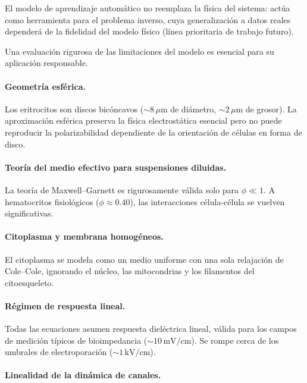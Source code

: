 \documentclass[12pt]{article}
\begin{document}
El modelo de aprendizaje autom\'atico no reemplaza la
f\'isica del sistema: act\'ua como herramienta para el
problema inverso, cuya generalizaci\'on a datos reales
depender\'a de la fidelidad del modelo f\'isico
(l\'inea prioritaria de trabajo futuro).



Una evaluaci\'on rigurosa de las limitaciones del modelo es esencial para su aplicaci\'on
responsable.
\paragraph{Geometr\'ia esf\'erica.}

Los eritrocitos son discos bic\'oncavos ($\sim 8\,\mu$m de di\'ametro, $\sim 2\,\mu$m de
grosor). La aproximaci\'on esf\'erica preserva la f\'isica electrost\'atica esencial pero no puede
reproducir la polarizabilidad dependiente de la orientaci\'on de c\'elulas en forma de disco.

\paragraph{Teor\'ia del medio efectivo para suspensiones diluidas.}

La teor\'ia de Maxwell--Garnett es rigurosamente v\'alida solo para $\phi \ll 1$. A hematocritos
fisiol\'ogicos ($\phi \approx 0.40$), las interacciones c\'elula-c\'elula se vuelven significativas.

\paragraph{Citoplasma y membrana homog\'eneos.}

El citoplasma se modela como un medio uniforme con una sola relajaci\'on de Cole--Cole,
ignorando el n\'ucleo, las mitocondrias y los filamentos del citoesqueleto.

\paragraph{R\'egimen de respuesta lineal.}

Todas las ecuaciones asumen respuesta diel\'ectrica lineal, v\'alida para los campos de medici\'on
t\'ipicos de bioimpedancia ($\sim 10\,\text{mV/cm}$). Se rompe cerca de los umbrales de
electroporaci\'on ($\sim 1\,\text{kV/cm}$).

\paragraph{Linealidad de la din\'amica de canales.}
\end{document}
